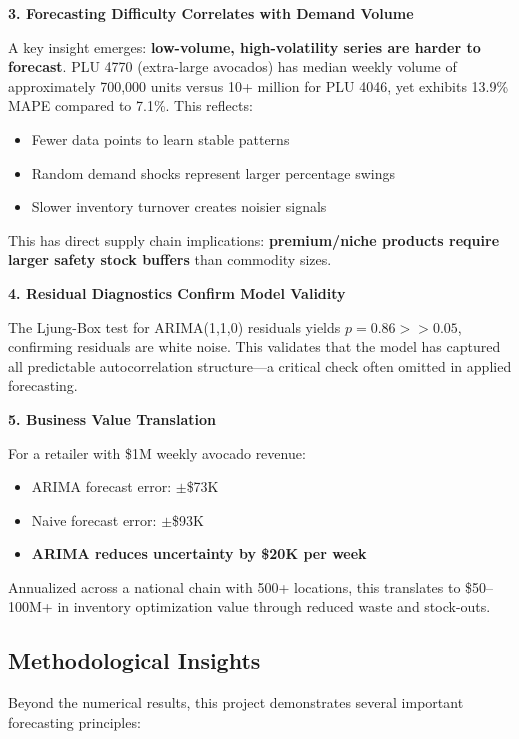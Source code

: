 \documentclass[12pt]{article}
\begin{document}
\textbf{3. Forecasting Difficulty Correlates with Demand Volume}

A key insight emerges: \textbf{low-volume, high-volatility series are harder to forecast}. PLU 4770 (extra-large avocados) has median weekly volume of approximately 700,000 units versus 10+ million for PLU 4046, yet exhibits 13.9\% MAPE compared to 7.1\%. This reflects:
\begin{itemize}
    \item Fewer data points to learn stable patterns
    \item Random demand shocks represent larger percentage swings
    \item Slower inventory turnover creates noisier signals
\end{itemize}

This has direct supply chain implications: \textbf{premium/niche products require larger safety stock buffers} than commodity sizes.

\textbf{4. Residual Diagnostics Confirm Model Validity}

The Ljung-Box test for ARIMA(1,1,0) residuals yields $p = 0.86 >> 0.05$, confirming residuals are white noise. This validates that the model has captured all predictable autocorrelation structure---a critical check often omitted in applied forecasting.

\textbf{5. Business Value Translation}

For a retailer with \$1M weekly avocado revenue:
\begin{itemize}
    \item ARIMA forecast error: $\pm$\$73K
    \item Naive forecast error: $\pm$\$93K
    \item \textbf{ARIMA reduces uncertainty by \$20K per week}
\end{itemize}

Annualized across a national chain with 500+ locations, this translates to \$50--100M+ in inventory optimization value through reduced waste and stock-outs.

\subsection{Methodological Insights}

Beyond the numerical results, this project demonstrates several important forecasting principles:
\end{document}
